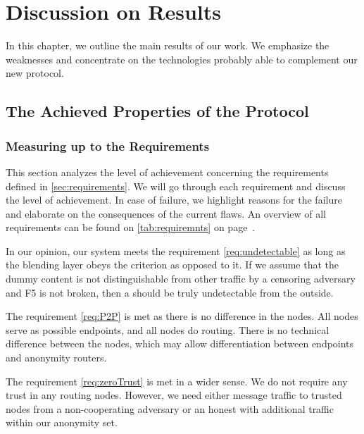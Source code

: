 \part{Discussion on Results}

In this chapter, we outline the main results of our work. We emphasize the weaknesses and concentrate on the technologies probably able to complement our new protocol.

\chapter{The Achieved Properties of the Protocol}
\section{Measuring up to the Requirements\label{sec:reqDiscussion}}
This section analyzes the level of achievement concerning the requirements defined in \cref{sec:requirements}. We will go through each requirement and discuss the level of achievement. In case of failure, we highlight reasons for the failure and elaborate on the consequences of the current flaws. An overview of all requirements can be found on \cref{tab:requiremnts} on page~\pageref{tab:requiremnts}.

In our opinion, our system meets the requirement \ref{req:undetectable} as long as the blending layer obeys the criterion as opposed to it. If we assume that the dummy content is not distinguishable from other traffic by a censoring adversary and F5 is not broken, then a \VortexNode{} should be truly undetectable from the outside.

The requirement \ref{req:P2P} is met as there is no difference in the nodes. All nodes serve as possible endpoints, and all nodes do routing. There is no technical difference between the nodes, which may allow differentiation between endpoints and anonymity routers.

The requirement \ref{req:zeroTrust} is met in a wider sense. We do not require any trust in any routing nodes. However, we need either message traffic to trusted nodes from a non-cooperating adversary or an honest \VortexNodes{} with additional traffic within our anonymity set. 

